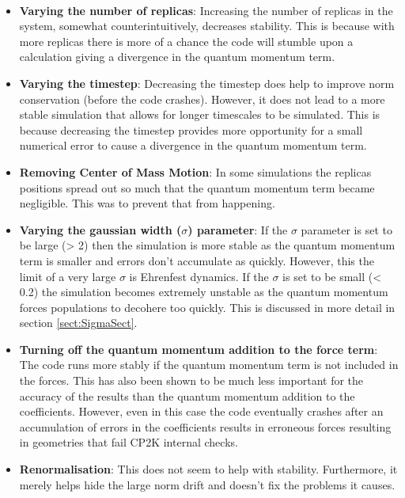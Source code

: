 \\
\begin{itemize}
	\item \textbf{Varying the number of replicas}: Increasing the number of replicas in the system, somewhat counterintuitively, decreases stability. This is because with more replicas there is more of a chance the code will stumble upon a calculation giving a divergence in the quantum momentum term.
	\item \textbf{Varying the timestep}: Decreasing the timestep does help to improve norm conservation (before the code crashes). However, it does not lead to a more stable simulation that allows for longer timescales to be simulated. This is because decreasing the timestep provides more opportunity for a small numerical error to cause a divergence in the quantum momentum term.
	\item \textbf{Removing Center of Mass Motion}: In some simulations the replicas positions spread out so much that the quantum momentum term became negligible. This was to prevent that from happening.
	\item \textbf{Varying the gaussian width ($\sigma$) parameter}: If the $\sigma$ parameter is set to be large (> 2) then the simulation is more stable as the quantum momentum term is smaller and errors don't accumulate as quickly. However, this the limit of a very large $\sigma$ is Ehrenfest dynamics. If the $\sigma$ is set to be small (< 0.2) the simulation becomes extremely unstable as the quantum momentum forces populations to decohere too quickly. This is discussed in more detail in section \ref{sect:SigmaSect}.
	\item \textbf{Turning off the quantum momentum addition to the force term}: The code runs more stably if the quantum momentum term is not included in the forces. This has also been shown to be much less important for the accuracy of the results than the quantum momentum addition to the coefficients. However, even in this case the code eventually crashes after an accumulation of errors in the coefficients results in erroneous forces resulting in geometries that fail CP2K internal checks.
	\item \textbf{Renormalisation}: This does not seem to help with stability. Furthermore, it merely helps hide the large norm drift and doesn't fix the problems it causes.
\end{itemize}
